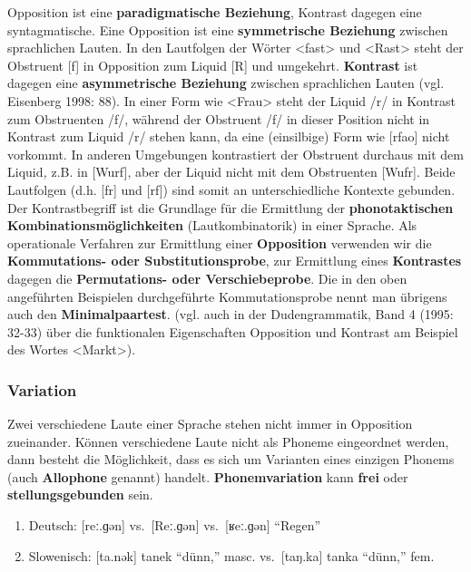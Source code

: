\documentclass[
]{article}
\providecommand{\tightlist}{%
  \setlength{\itemsep}{0pt}\setlength{\parskip}{0pt}}
\begin{document}
Opposition ist eine \textbf{paradigmatische Beziehung}, Kontrast dagegen eine
syntagmatische. Eine Opposition ist eine \textbf{symmetrische Beziehung}
zwischen sprachlichen Lauten. In den Lautfolgen der Wörter \textless fast\textgreater{} und
\textless Rast\textgreater{} steht der Obstruent {[}f{]} in Opposition zum Liquid {[}R{]} und
umgekehrt. \textbf{Kontrast} ist dagegen eine \textbf{asymmetrische Beziehung}
zwischen sprachlichen Lauten (vgl. Eisenberg 1998: 88). In einer Form
wie \textless Frau\textgreater{} steht der Liquid /r/ in Kontrast zum Obstruenten /f/,
während der Obstruent /f/ in dieser Position nicht in Kontrast zum
Liquid /r/ stehen kann, da eine (einsilbige) Form wie {[}rfao{]} nicht
vorkommt. In anderen Umgebungen kontrastiert der Obstruent durchaus mit
dem Liquid\emph{,} z.B. in {[}Wurf{]}, aber der Liquid nicht mit dem Obstruenten
{[}Wufr{]}. Beide Lautfolgen (d.h. {[}fr{]} und {[}rf{]}) sind somit an
unterschiedliche Kontexte gebunden. Der Kontrastbegriff ist die
Grundlage für die Ermittlung der \textbf{phonotaktischen
Kombinationsmöglichkeiten} (Lautkombinatorik) in einer Sprache. Als
operationale Verfahren zur Ermittlung einer \textbf{Opposition} verwenden wir
die \textbf{Kommutations- oder Substitutionsprobe}, zur Ermittlung eines
\textbf{Kontrastes} dagegen die \textbf{Permutations- oder Verschiebeprobe}. Die
in den oben angeführten Beispielen durchgeführte Kommutationsprobe nennt
man übrigens auch den \textbf{Minimalpaartest}. (vgl. auch in der
Dudengrammatik, Band 4 (1995: 32-33) über die funktionalen Eigenschaften
Opposition und Kontrast am Beispiel des Wortes \textless Markt\textgreater).

\hypertarget{variation}{%
\subsubsection{Variation}\label{variation}}

Zwei verschiedene Laute einer Sprache stehen nicht immer in Opposition
zueinander. Können verschiedene Laute nicht als Phoneme eingeordnet
werden, dann besteht die Möglichkeit, dass es sich um Varianten eines
einzigen Phonems (auch \textbf{Allophone} genannt) handelt.
\textbf{Phonemvariation} kann \textbf{frei} oder \textbf{stellungsgebunden} sein.

\begin{enumerate}
\def\labelenumi{(\arabic{enumi})}
\setcounter{enumi}{10}
\tightlist
\item
  Deutsch: {[}reː.ɡən{]} vs.~{[}Reː.ɡən{]} vs.~{[}ʁeː.ɡən{]} ``Regen''
\item
  Slowenisch: {[}ta.nək{]} tanek ``dünn,'' masc. vs.~{[}taŋ.ka{]} tanka ``dünn,''
  fem.
\end{enumerate}
\end{document}
